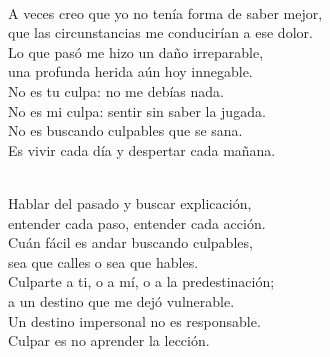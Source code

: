 \begin{lyrics}
\\
A veces creo que yo no tenía forma de saber mejor,\\
que las circunstancias me conducirían a ese dolor.\\
Lo que pasó me hizo un daño irreparable,\\
una profunda herida aún hoy innegable.\\
No es tu culpa: no me debías nada.\\
No es mi culpa: sentir sin saber la jugada.\\
No es buscando culpables que se sana.\\
Es vivir cada día y despertar cada mañana.

\\
Hablar del pasado y buscar explicación,\\
entender cada paso, entender cada acción.\\
Cuán fácil es andar buscando culpables,\\
sea que calles o sea que hables.\\
Culparte a ti, o a mí, o a la predestinación;\\
a un destino que me dejó vulnerable.\\
Un destino impersonal no es responsable.\\
Culpar es no aprender la lección.
\end{lyrics}

